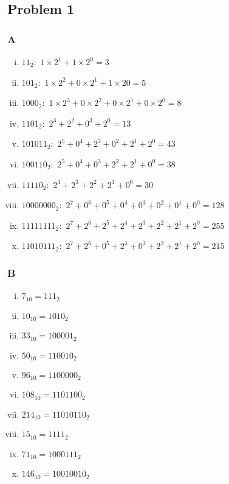 \documentclass[a4paper]{article}
\begin{document}
  \subsection*{Problem 1}
  \subsubsection*{A}
  \begin{enumerate}[i.]
    \item $11_{2}:$
    $1\times 2^{1}+1\times 2^{0} = 3$
    
    \item $101_{2}:$
    $1\times 2^{2}+0\times 2^{1}+1\times 2{0} = 5$
    
    \item $1000_{2}:$
    $1\times 2^{3}+0\times 2^{2}+0\times 2^{1}+0\times 2^{0} = 8$
    
    \item $1101_{2}:$
    $2^{3}+2^{2}+0^{3}+2^{0} = 13$
    
    \item $101011_{2}:$
    $2^{5}+0^{4}+2^{3}+0^{2}+2^{1}+2^{0} = 43$
    
    \item $100110_{2}:$
    $2^{5}+0^{4}+0^{3}+2^{2}+2^{1}+0^{0} = 38$
     
    \item $11110_{2}:$
    $2^{4}+2^{3}+2^{2}+2^{1}+0^{0} = 30$
    
    \item $10000000_{2}:$
    $2^{7}+0^{6}+0^{5}+0^{4}+0^{3}+0^{2}+0^{1}+0^{0} = 128$
    
    \item $11111111_{2}:$
    $2^{7}+2^{6}+2^{5}+2^{4}+2^{3}+2^{2}+2^{1}+2^{0} = 255$
    
    \item $11010111_{2}:$
    $2^{7}+2^{6}+0^{5}+2^{4}+0^{3}+2^{2}+2^{1}+2^{0} = 215$
    
  \end{enumerate}
  \subsubsection*{B}

  \begin{enumerate}[i.]
    \item $7_{10} = 111_{2}$
    \item $10_{10} = 1010_{2} $
    \item $33_{10} = 100001_{2}$
    \item $50_{10} = 110010_{2}$
    \item $96_{10} = 1100000_{2}$
    \item $108_{10} = 1101100_{2}$
    \item $214_{10} = 11010110_{2}$
    \item $15_{10} = 1111_{2}$
    \item $71_{10} = 1000111_{2}$
    \item $146_{10} = 10010010_{2}$
  \end{enumerate}
\end{document}
